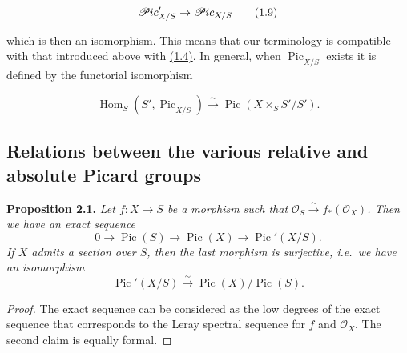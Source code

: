 \documentclass{article}
\newenvironment{itenv}[1]
  {\phantomsection\par\smallskip\noindent\textbf{#1.}\itshape}
  {\par\smallskip}
\newenvironment{eqenv}
  {}
  {}
\theoremstyle{definition}
\theoremstyle{definition}
\theoremstyle{definition}
\theoremstyle{definition}
\theoremstyle{remark}
\begin{document}
\leavevmode{}%
\begin{eqenv}
\[
  \mathscr{P}\kern -.5pt ic'_{X/S}
  \to \mathscr{P}\kern -.5pt ic_{X/S}
\tag{1.9}
\]

\end{eqenv}

which is then an isomorphism.
This means that our terminology is compatible with that introduced above with \protect\hyperlink{fga-3-v-equation-1.4}{(1.4)}.
In general, when \(\underline{\operatorname{Pic}}_{X/S}\) exists it is defined by the functorial isomorphism

\leavevmode{}%
\begin{eqenv}
\[
  \operatorname{Hom}_S(S',\underline{\operatorname{Pic}}_{X/S})
  \xrightarrow{\sim}\operatorname{Pic}(X\times_S S'/S').
\tag{1.10}
\]

\end{eqenv}

\hypertarget{fga-3-v-section-2}{%
\subsection{Relations between the various relative and absolute Picard groups}\label{fga-3-v-section-2}}

\leavevmode{}%
\begin{itenv}{Proposition 2.1}
Let \(f\colon X\to S\) be a morphism such that \({\mathscr{O}}_S\xrightarrow{\sim}f_*({\mathscr{O}}_X)\).
Then we have an exact sequence
\[
  0
  \to \operatorname{Pic}(S)
  \to \operatorname{Pic}(X)
  \to \operatorname{Pic}'(X/S).
\]
If \(X\) admits a section over \(S\), then the last morphism is surjective, i.e.~we have an isomorphism
\[
  \operatorname{Pic}'(X/S)
  \xrightarrow{\sim}\operatorname{Pic}(X)/\operatorname{Pic}(S).
\]

\end{itenv}

\begin{proof}
The exact sequence can be considered as the low degrees of the exact sequence that corresponds to the Leray spectral sequence for \(f\) and \({\mathscr{O}}_X\).
The second claim is equally formal.
\end{proof}
\end{document}

